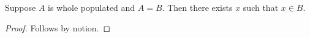 

\begin{proposition}\label{whole_expansion_stays_exact}
    Suppose $A$ is whole populated and $A=B$.
    Then there exists $x$ such that $x\in B$.
\end{proposition}
\begin{proof}
    Follows by notion.
\end{proof}
